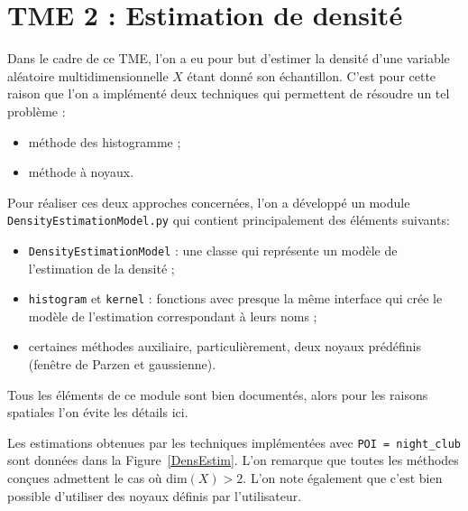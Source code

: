 \documentclass[a4paper,11pt]{article}
\theoremstyle{plain}
\theoremstyle{definition}
\begin{document}
\section{TME 2 : Estimation de densité}
\label{tme2}

Dans le cadre de ce TME, l'on a eu pour but d'estimer la densité d'une variable aléatoire multidimensionnelle $X$ étant donné son échantillon. C'est pour cette raison que l'on a implémenté deux techniques qui permettent de résoudre un tel problème :
\begin{itemize}
    \item méthode des histogramme ;
    \item méthode à noyaux.
\end{itemize}
Pour réaliser ces deux approches concernées, l'on a développé un module \texttt{DensityEstimationModel.py} qui contient principalement des éléments suivants:
\begin{itemize}
    \item \texttt{DensityEstimationModel} : une classe qui représente un modèle de l'estimation de la densité ;
    \item \texttt{histogram} et \texttt{kernel} : fonctions avec presque la même interface qui crée le modèle de l'estimation correspondant à leurs noms ;
    \item certaines méthodes auxiliaire, particulièrement, deux noyaux prédéfinis (fenêtre de Parzen et gaussienne).
\end{itemize}
Tous les éléments de ce module sont bien documentés, alors pour les raisons spatiales l'on évite les détails ici.

Les estimations obtenues par les techniques implémentées avec \texttt{POI = night\_club} sont données dans la Figure~\ref{DensEstim}. L'on remarque que toutes les méthodes conçues admettent le cas où $\text{dim}(X) > 2$. L'on note également que c'est bien possible d'utiliser des noyaux définis par l'utilisateur.
\end{document}
